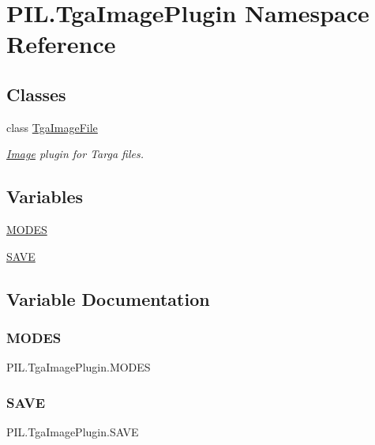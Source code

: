 \hypertarget{namespacePIL_1_1TgaImagePlugin}{}\section{P\+I\+L.\+Tga\+Image\+Plugin Namespace Reference}
\label{namespacePIL_1_1TgaImagePlugin}
\subsection*{Classes}
\begin{DoxyCompactItemize}
\item 
class \hyperlink{classPIL_1_1TgaImagePlugin_1_1TgaImageFile}{Tga\+Image\+File}
\begin{DoxyCompactList}\small\item\em \hyperlink{namespacePIL_1_1Image}{Image} plugin for Targa files. \end{DoxyCompactList}\end{DoxyCompactItemize}
\subsection*{Variables}
\begin{DoxyCompactItemize}
\item 
\hyperlink{namespacePIL_1_1TgaImagePlugin_a86354ddfbf4b70cae0ca73acf601a387}{M\+O\+D\+ES}
\item 
\hyperlink{namespacePIL_1_1TgaImagePlugin_ae97eea2a9a9905fba777ac84964a549d}{S\+A\+VE}
\end{DoxyCompactItemize}


\subsection{Variable Documentation}
\mbox{\label{namespacePIL_1_1TgaImagePlugin_a86354ddfbf4b70cae0ca73acf601a387}} 
\subsubsection{\texorpdfstring{M\+O\+D\+ES}{MODES}}
{\footnotesize\ttfamily P\+I\+L.\+Tga\+Image\+Plugin.\+M\+O\+D\+ES}

\mbox{\label{namespacePIL_1_1TgaImagePlugin_ae97eea2a9a9905fba777ac84964a549d}} 
\subsubsection{\texorpdfstring{S\+A\+VE}{SAVE}}
{\footnotesize\ttfamily P\+I\+L.\+Tga\+Image\+Plugin.\+S\+A\+VE}

